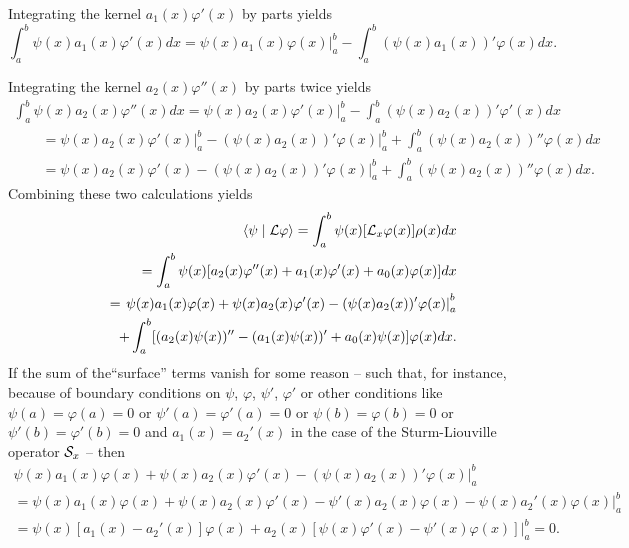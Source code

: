 Integrating the  kernel $a_1(x) \varphi'(x)$ by parts yields
\begin{equation}
\int_a^b
\psi (x)
  a_1(x) \varphi'(x)
dx
=
\left.
\psi (x)
  a_1(x) \varphi(x)
\right|_a^b -  \int_a^b
(\psi (x)
  a_1(x) )'\varphi(x)
dx
.
\end{equation}

Integrating the  kernel $a_2(x) \varphi''(x)$ by parts twice yields
\begin{equation}
\begin{split}
\int_a^b
\psi (x)
  a_2(x) \varphi''(x)
dx
=
\left.
\psi (x)
  a_2(x) \varphi'(x)
\right|_a^b -  \int_a^b
(\psi (x)
  a_2(x) )'\varphi'(x)
dx
\\
\qquad =
\left.
\psi (x)
  a_2(x) \varphi'(x)
\right|_a^b -
\left.
(\psi (x)
  a_2(x))' \varphi(x)
\right|_a^b
+
  \int_a^b
(\psi (x)
  a_2(x) )''\varphi(x)
dx    \\
\qquad =
\left.
\psi (x)
  a_2(x) \varphi'(x)
 -
(\psi (x)
  a_2(x))' \varphi(x)
\right|_a^b
+
  \int_a^b
(\psi (x)
  a_2(x) )''\varphi(x)
dx
.
\end{split}
\end{equation}
Combining these two calculations yields
\begin{equation}
\begin{split}
\langle \psi \mid {\cal L} \varphi \rangle
=
\int_a^b
\psi (x) [{\cal L}_x\varphi (x)]
\rho  (x)         dx   \\
\qquad =
\int_a^b
\psi (x)
[a_2(x) \varphi''(x) + a_1(x) \varphi'(x) + a_0(x) \varphi (x)]
dx      \\
\qquad =
\left.
\psi (x)
  a_1(x) \varphi(x)
+
\psi (x)
  a_2(x) \varphi'(x)
 -
(\psi (x)
  a_2(x))' \varphi(x)
\right|_a^b   \\
\qquad
\qquad
+
  \int_a^b
[( a_2(x)\psi (x) )'' - ( a_1(x)\psi (x)  )'    + a_0(x) \psi (x)] \varphi(x)
dx
.
\end{split}
\label{2011-m-ch-slspbtfao1aaa}
\end{equation}
If the sum of the``surface'' terms vanish for some reason
-- such that, for instance, because of boundary conditions on
$\psi $,  $\varphi$, $\psi'$, $\varphi'$ or other conditions
like
$\psi (a)= \varphi (a) =0$  or
$\psi' (a) = \varphi' (a)=0$
or $\psi (b)= \varphi (b) =0$  or
$\psi' (b) = \varphi' (b)=0$
 and
$a_1(x)=a_2'(x)$ in the case of the Sturm-Liouville
operator ${\cal S}_x$ -- then
\begin{equation}
\begin{split}
\left.
\psi (x)
  a_1(x) \varphi(x)
+
\psi (x)
  a_2(x) \varphi'(x)
 -
(\psi (x)
  a_2(x))' \varphi(x)
\right|_a^b
\\=
\left.
\psi (x) a_1(x) \varphi(x)
+
\psi (x)
  a_2(x) \varphi'(x)
 -
 \psi' (x)
  a_2(x)  \varphi(x)
-  \psi (x)
  a_2'(x)  \varphi(x)
\right|_a^b
\\=
\psi (x)
\left[
  a_1(x) - a_2'(x)
\right]
\varphi(x)
+ a_2(x)
\left[
\psi (x)
  \varphi'(x)
 -
 \psi' (x)
   \varphi(x)
\right]
\Big|_a^b
=0.
\label{2016-m-ch-sl-bc}
\end{split}
\end{equation}

